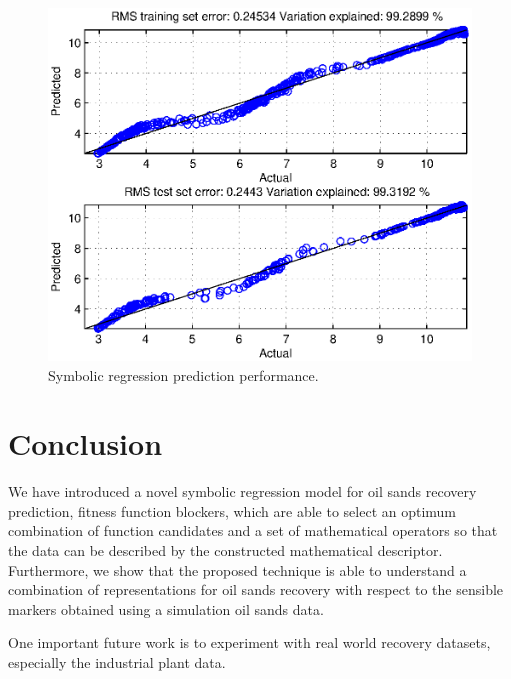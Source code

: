 \documentclass[10pt,journal,compsoc]{IEEEtran}
\begin{document}
         \begin{figure}[tb]
                \centering
                \includegraphics[width=\linewidth,clip]{sensitivity2.eps}
                \vspace{-2em}
                         \caption{Symbolic regression prediction performance.}
                \label{fig:sensitivity2.eps}
           \end{figure}


\section{Conclusion} %
\label{sec:conclusion}
We have introduced a novel symbolic regression model for oil sands recovery prediction, fitness function blockers, which are able to select an optimum combination of function candidates and a set of mathematical operators so that the data can be described by the constructed mathematical descriptor. Furthermore, we show that the proposed technique is able to understand a combination of representations for oil sands recovery with respect to the sensible markers obtained using a simulation oil sands data.

One important future work is to experiment with real world recovery datasets, especially the industrial plant data.

\end{document}
